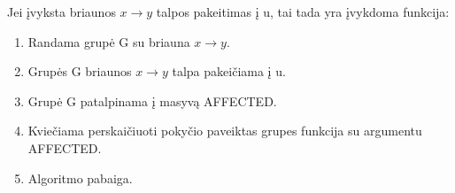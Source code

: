 Jei įvyksta briaunos $x \rightarrow y$ talpos pakeitimas į u, tai tada yra įvykdoma funkcija:
\begin{enumerate}
\item Randama grupė G su briauna $x \rightarrow y$.
\item Grupės G briaunos $x \rightarrow y$ talpa pakeičiama į u.
\item  Grupė G patalpinama į masyvą AFFECTED.
\item Kviečiama perskaičiuoti pokyčio paveiktas grupes funkcija su argumentu AFFECTED.
\item Algoritmo pabaiga. 
\end{enumerate}